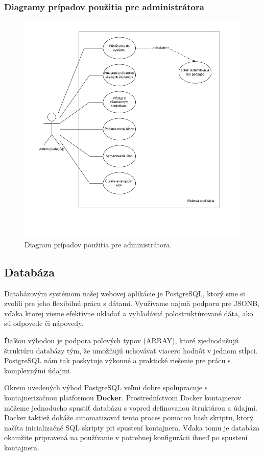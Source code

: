 \subsubsection*{Diagramy prípadov použitia pre administrátora}
\begin{figure}[H]
  \centering
  \includegraphics[width=16cm]{img/diagram_admin.png}
  \caption{Diagram prípadov použitia pre administrátora.}
  \label{admindiagram}
\end{figure}



 \subsection{Databáza}
 Databázovým systémom našej webovej aplikácie je PostgreSQL, ktorý sme si zvolili pre jeho flexibilnú prácu s dátami. 
 Využívame najmä podporu pre JSONB, vďaka ktorej vieme efektívne ukladať a vyhľadávať polostruktúrované dáta, ako sú odpovede či nápovedy.

Ďalšou výhodou je podpora poľových typov (ARRAY), ktoré zjednodušujú štruktúru databázy tým, že umožňujú uchovávať viacero hodnôt v jednom stĺpci. 
PostgreSQL nám tak poskytuje výkonné a praktické riešenie pre prácu s komplexnými údajmi.

Okrem uvedených výhod PostgreSQL veľmi dobre spolupracuje s kontajnerizačnou platformou \textbf{Docker}.
Prostredníctvom Docker kontajnerov môžeme jednoducho spustiť databázu s vopred definovanou štruktúrou a údajmi.
Docker taktiež dokáže automatizovať tento proces pomocou bash skriptu, ktorý načíta inicializačné SQL skripty pri spustení kontajnera.
Vďaka tomu je databáza okamžite pripravená na používanie v potrebnej konfigurácii ihneď po spustení kontajnera.

